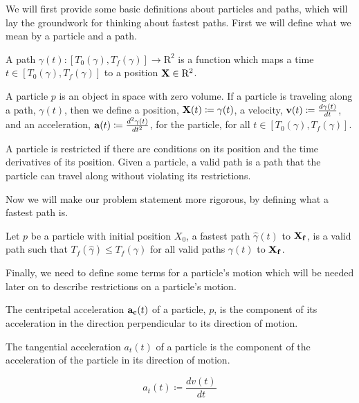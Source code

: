 We will first provide some basic definitions about particles and paths, which will lay the groundwork for thinking about fastest paths. First we will define what we mean by a particle and a path.

\begin{definition}
  A path $\gamma(t): [T_0(\gamma), T_f(\gamma)] \to \mathrm{R}^2$ is a function which maps a time $t \in [T_0(\gamma), T_f(\gamma)]$ to a position $\mathbf{X} \in \mathrm{R}^2$.
\end{definition}

\begin{definition}
  A particle $p$ is an object in space with zero volume. If a particle is traveling along a path, $\gamma(t)$, then we define a position, $\mathbf{X}(t) \coloneqq \gamma(t)$, a velocity, $\mathbf{v}(t) \coloneqq \frac{d\gamma(t)}{dt}$, and an acceleration, $\mathbf{a}(t) \coloneqq \frac{d^2\gamma(t)}{dt^2}$, for the particle, for all $t \in [T_0(\gamma), T_f(\gamma)]$.

  A particle is restricted if there are conditions on its position and the time derivatives of its position. Given a particle, a valid path is a path that the particle can travel along without violating its restrictions.
\end{definition}

Now we will make our problem statement more rigorous, by defining what a fastest path is.

\begin{definition}
  Let $p$ be a particle with initial position $X_0$, a fastest path $\hat{\gamma}(t)$ to $\mathbf{X_f}$, is a valid path such that $T_f(\hat{\gamma}) \leq T_f(\gamma)$ for all valid paths $\gamma(t)$ to $\mathbf{X_f}$.
\end{definition}

Finally, we need to define some terms for a particle's motion which will be needed later on to describe restrictions on a particle's motion.

\begin{definition}
  The centripetal acceleration $\mathbf{a_c}(t)$ of a particle, $p$, is the component of its acceleration in the direction perpendicular to its direction of motion.
\end{definition}

\begin{definition}
  The tangential acceleration $a_t(t)$ of a particle is the component of the acceleration of the particle in its direction of motion.

  \[a_t(t) \coloneqq \frac{dv(t)}{dt}\]
\end{definition}

